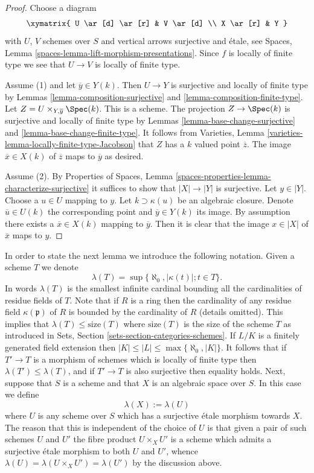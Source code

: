 \begin{proof}
Choose a diagram
$$
\xymatrix{
U \ar[d] \ar[r] & V \ar[d] \\
X \ar[r] & Y
}
$$
with $U$, $V$ schemes over $S$ and vertical arrows surjective
and \'etale, see
Spaces, Lemma \ref{spaces-lemma-lift-morphism-presentations}.
Since $f$ is locally of finite type we see that $U \to V$ is locally of
finite type.

\medskip\noindent
Assume (1) and let $\overline{y} \in Y(k)$. Then $U \to Y$ is
surjective and locally of finite type by
Lemmas \ref{lemma-composition-surjective} and
\ref{lemma-composition-finite-type}.
Let $Z = U \times_{Y, \overline{y}} \Spec(k)$. This is a scheme.
The projection $Z \to \Spec(k)$
is surjective and locally of finite type by
Lemmas \ref{lemma-base-change-surjective} and
\ref{lemma-base-change-finite-type}.
It follows from
Varieties, Lemma \ref{varieties-lemma-locally-finite-type-Jacobson}
that $Z$ has a $k$ valued point $\overline{z}$. The image
$\overline{x} \in X(k)$ of $\overline{z}$ maps to $\overline{y}$
as desired.

\medskip\noindent
Assume (2). By
Properties of Spaces,
Lemma \ref{spaces-properties-lemma-characterize-surjective}
it suffices to show that $|X| \to |Y|$ is surjective.
Let $y \in |Y|$. Choose a $u \in U$ mapping to $y$.
Let $k \supset \kappa(u)$ be an algebraic closure. Denote
$\overline{u} \in U(k)$ the corresponding point and
$\overline{y} \in Y(k)$ its image. By assumption there exists
a $\overline{x} \in X(k)$ mapping to $\overline{y}$.
Then it is clear that the image $x \in |X|$ of $\overline{x}$
maps to $y$.
\end{proof}

\noindent
In order to state the next lemma we introduce the following
notation. Given a scheme $T$ we denote
$$
\lambda(T) = \sup\{\aleph_0, |\kappa(t)| ; t \in T\}.
$$
In words $\lambda(T)$ is the smallest infinite cardinal bounding
all the cardinalities of residue fields of $T$. Note that if $R$
is a ring then the cardinality of any residue field $\kappa(\mathfrak p)$
of $R$ is bounded by the cardinality of $R$ (details omitted).
This implies that $\lambda(T) \leq \text{size}(T)$ where
$\text{size}(T)$ is the size of the scheme $T$ as introduced in
Sets, Section \ref{sets-section-categories-schemes}.
If $L/K$ is a finitely generated field extension then
$|K| \leq |L| \leq \max\{\aleph_0, |K|\}$. It follows that if $T' \to T$
is a morphism of schemes which is locally of finite
type then $\lambda(T') \leq \lambda(T)$, and if $T' \to T$ is also
surjective then equality holds. Next, suppose that $S$ is a scheme
and that $X$ is an algebraic space over $S$. In this case we define
$$
\lambda(X) := \lambda(U)
$$
where $U$ is any scheme over $S$ which has a surjective \'etale morphism
towards $X$. The reason that this is independent of the choice of $U$
is that given a pair of such schemes $U$ and $U'$ the fibre product
$U \times_X U'$ is a scheme which admits a surjective \'etale morphism
to both $U$ and $U'$, whence $\lambda(U) = \lambda(U \times_X U') =
\lambda(U')$ by the discussion above.

